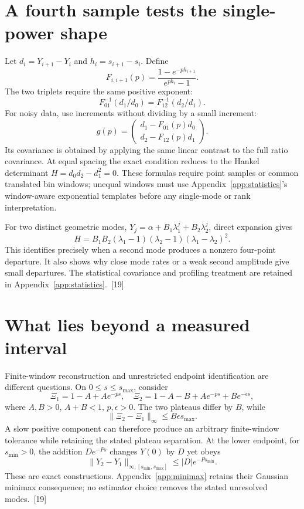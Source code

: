 \documentclass[10pt,twocolumn,letterpaper]{article}
\begin{document}
\section{A fourth sample tests the single-power shape}
Let $d_i=Y_{i+1}-Y_i$ and $h_i=s_{i+1}-s_i$. Define
\[
 F_{i,i+1}(p)=\frac{1-e^{-ph_{i+1}}}{e^{ph_i}-1}.
\]
The two triplets require the same positive exponent:
\[
 F_{01}^{-1}(d_1/d_0)=F_{12}^{-1}(d_2/d_1).
\]
For noisy data, use increments without dividing by a small increment:
\[
 g(p)=\begin{pmatrix}d_1-F_{01}(p)d_0\\d_2-F_{12}(p)d_1\end{pmatrix}.
\]
Its covariance is obtained by applying the same linear contrast to the full ratio covariance. At equal spacing the exact condition reduces to the Hankel determinant $H=d_0d_2-d_1^2=0$. These formulas require point samples or common translated bin windows; unequal windows must use Appendix~\ref{app:statistics}'s window-aware exponential templates before any single-mode or rank interpretation.

For two distinct geometric modes, $Y_j=\alpha+B_1\lambda_1^j+B_2\lambda_2^j$, direct expansion gives
\[
 H=B_1B_2(\lambda_1-1)(\lambda_2-1)(\lambda_1-\lambda_2)^2.
\]
This identifies precisely when a second mode produces a nonzero four-point departure. It also shows why close mode rates or a weak second amplitude give small departures. The statistical covariance and profiling treatment are retained in Appendix~\ref{app:statistics}.~[19]





\section{What lies beyond a measured interval}
Finite-window reconstruction and unrestricted endpoint identification are different questions. On $0\le s\le s_{\max}$, consider
\[
 \Xi_1=1-A+Ae^{-ps},\quad
 \Xi_2=1-A-B+Ae^{-ps}+Be^{-\epsilon s},
\]
where $A,B>0$, $A+B<1$, $p,\epsilon>0$. The two plateaus differ by $B$, while
\[
 \|\Xi_2-\Xi_1\|_\infty\le B\epsilon s_{\max}.
\]
A slow positive component can therefore produce an arbitrary finite-window tolerance while retaining the stated plateau separation. At the lower endpoint, for $s_{\min}>0$, the addition $De^{-Ps}$ changes $Y(0)$ by $D$ yet obeys
\[
 \|Y_2-Y_1\|_{\infty,[s_{\min},s_{\max}]}\le |D|e^{-Ps_{\min}}.
\]
These are exact constructions. Appendix~\ref{app:minimax} retains their Gaussian minimax consequence; no estimator choice removes the stated unresolved modes.~[19]
\end{document}
